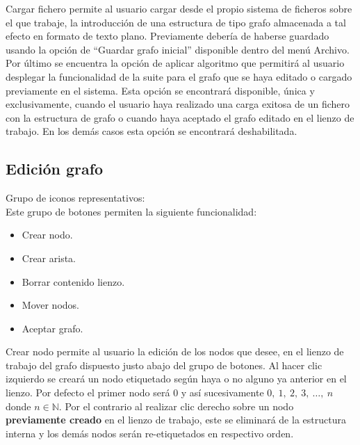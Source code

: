 Cargar fichero permite al usuario cargar desde el propio sistema de ficheros sobre el que trabaje, la introducción de una estructura de tipo grafo almacenada a tal efecto en formato de texto plano. Previamente debería de haberse guardado usando la opción de ``Guardar grafo inicial'' disponible dentro del menú Archivo. \\

Por último se encuentra la opción de aplicar algoritmo que permitirá al usuario desplegar la funcionalidad de la suite para el grafo que se haya editado o cargado previamente en el sistema. Esta opción se encontrará disponible, única y exclusivamente, cuando el usuario haya realizado una carga exitosa de un fichero con la estructura de grafo o cuando haya aceptado el grafo editado en el lienzo de trabajo. En los demás casos esta opción se encontrará deshabilitada. \\

\subsection{Edición grafo}

Grupo de iconos representativos:  \\

Este grupo de botones permiten la siguiente funcionalidad:

\begin{itemize}
\item Crear nodo. \quad {}
\item Crear arista. \quad {}
\item Borrar contenido lienzo. \quad {}
\item Mover nodos. \quad {}
\item Aceptar grafo. \quad {}
\end{itemize}

Crear nodo permite al usuario la edición de los nodos que desee, en el lienzo de trabajo del grafo dispuesto justo abajo del grupo de botones. Al hacer clic izquierdo se creará un nodo etiquetado según haya o no alguno ya anterior en el lienzo. Por defecto el primer nodo será $0$ y así sucesivamente $0,\ 1,\ 2,\ 3,\ \ldots,\ n$ donde $n \in \mathbb{N}$. Por el contrario al realizar clic derecho sobre un nodo \textbf{previamente creado} en el lienzo de trabajo, este se eliminará de la estructura interna y los demás nodos serán re-etiquetados en respectivo orden. \\

